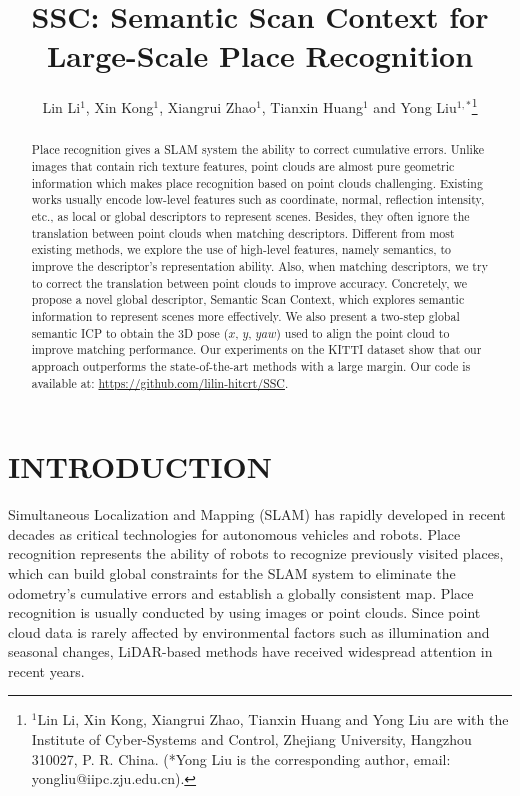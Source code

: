 \documentclass[letterpaper, 10 pt, conference]{ieeeconf}
\title{\LARGE \bf
SSC: Semantic Scan Context for Large-Scale Place Recognition
}
\author{Lin Li$^{1}$, Xin Kong$^{1}$, Xiangrui Zhao$^{1}$, Tianxin Huang$^{1}$ and Yong Liu$^{1,*}$\thanks{$^{1}$Lin Li, Xin Kong, Xiangrui Zhao, Tianxin Huang and Yong Liu are with the Institute of Cyber-Systems and Control, Zhejiang University, Hangzhou 310027, P. R. China. (*Yong Liu is the corresponding author, email: yongliu@iipc.zju.edu.cn).}
}
\begin{document}
\maketitle
\thispagestyle{empty}
\pagestyle{empty}


\begin{abstract}

Place recognition gives a SLAM system the ability to correct cumulative errors. Unlike images that contain rich texture features, point clouds are almost pure geometric information which makes place recognition based on point clouds challenging. Existing works usually encode low-level features such as coordinate, normal, reflection intensity, etc., as local or global descriptors to represent scenes. Besides, they often ignore the translation between point clouds when matching descriptors. Different from most existing methods, we explore the use of high-level features, namely semantics, to improve the descriptor's representation ability. Also, when matching descriptors, we try to correct the translation between point clouds to improve accuracy. Concretely, we propose a novel global descriptor, Semantic Scan Context, which explores semantic information to represent scenes more effectively. We also present a two-step global semantic ICP to obtain the 3D pose (\(x\), \(y\), \(yaw\)) used to align the point cloud to improve matching performance. Our experiments on the KITTI dataset show that our approach outperforms the state-of-the-art methods with a large margin. Our code is available at: \url{https://github.com/lilin-hitcrt/SSC}.

\end{abstract}


\section{INTRODUCTION}

Simultaneous Localization and Mapping (SLAM) has rapidly developed in recent decades as critical technologies for autonomous vehicles and robots. Place recognition represents the ability of robots to recognize previously visited places, which can build global constraints for the SLAM system to eliminate the odometry's cumulative errors and establish a globally consistent map\cite{4633680}. Place recognition is usually conducted by using images or point clouds. Since point cloud data is rarely affected by environmental factors such as illumination and seasonal changes, LiDAR-based methods have received widespread attention in recent years.
\end{document}
